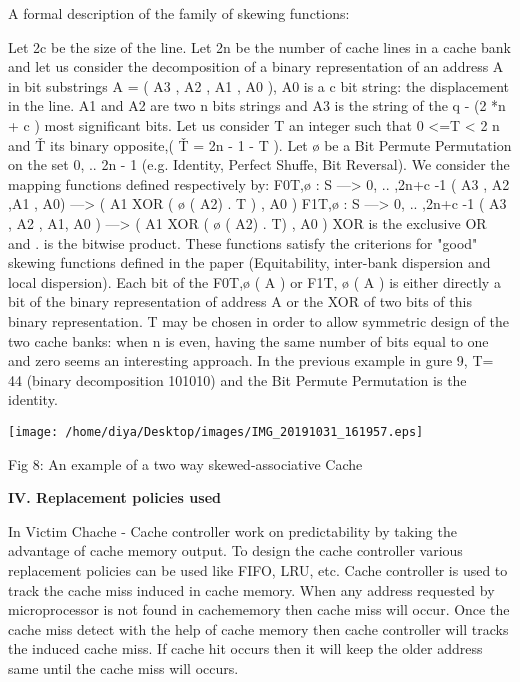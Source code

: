 \documentclass [ 12pt, letterpaper, twoside] {article}
\begin{document}
A formal description of the family of skewing functions:

Let 2c be the size of the line.
Let 2n be the number of cache lines in a cache bank and let us consider the decomposition of a binary representation of an address A in bit substrings A = ( A3 , A2 , A1 , A0 ), A0 is a c bit string: the displacement in the line. A1 and A2 are two n bits strings and A3 is the string of the q - (2 *n + c ) most significant bits.
Let us consider T an integer such that 0 <=T < 2 n and Ť its binary opposite,( Ť = 2n - 1 - T ).
Let ø be a Bit Permute Permutation on the set {0, ..  2n - 1 } (e.g. Identity, Perfect Shuffe, Bit Reversal).
We consider the mapping functions defined respectively by:
                                                           F0T,ø : S                ---> {0, .. ,2n+c  -1 }
                                                                    ( A3 , A2  ,A1 , A0) ---> ( A1 XOR ( ø ( A2) . T ) , A0 )
                                                           F1T,ø : S                ---> { 0, .. ,2n+c -1 }
                                                                    ( A3 , A2 , A1,  A0 ) ---> ( A1 XOR ( ø ( A2) . T) , A0 )
XOR is the exclusive OR and . is the bitwise product.
These functions satisfy the criterions for "good" skewing functions defined in the paper (Equitability, inter-bank dispersion and local dispersion).
Each bit of the F0T,ø ( A ) or F1T, ø ( A ) is either directly a bit of the binary representation of address A or the XOR of two bits of this binary representation.
T may be chosen in order to allow symmetric design of the two cache banks: when n is even, having the same number of bits equal to one and zero seems an interesting approach.
In the previous example in gure 9, T= 44 (binary decomposition 101010) and the Bit Permute Permutation is the identity.

\texttt{[image: /home/diya/Desktop/images/IMG\_20191031\_161957.eps]}

Fig 8: An example of a two way skewed-associative Cache

\textbf{\large IV. Replacement policies used }

In Victim Chache -
Cache controller work on predictability by taking the advantage of cache memory output. To design the cache controller various replacement policies can be used like FIFO, LRU, etc. Cache controller is used to track the cache miss induced in cache memory. When any address requested by microprocessor is not found in cachememory then cache miss will occur. Once the cache miss detect with the help of cache memory then cache controller will tracks the induced cache miss. If cache hit occurs then it will keep the older address same until the cache miss will occurs.
\end{document}
